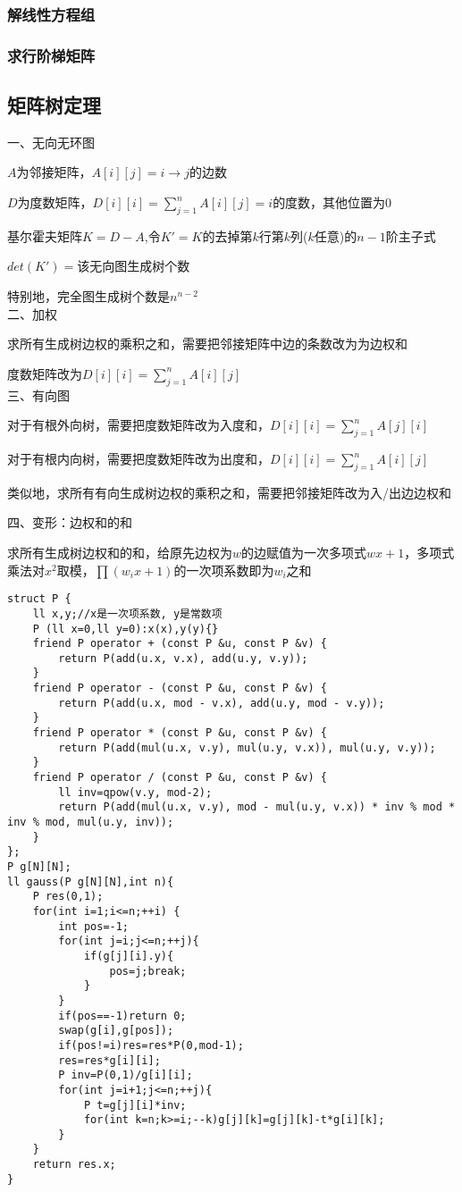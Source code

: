 \documentclass[a4paper]{article}
\begin{document}
\subsubsection{解线性方程组}

\subsubsection{求行阶梯矩阵}

\subsection{矩阵树定理}

一、无向无环图

$A$为邻接矩阵，$A[i][j]=i\to j$的边数

$D$为度数矩阵，$D[i][i]=\sum\limits_{j=1}^n A[i][j]=i$的度数，其他位置为0

基尔霍夫矩阵$K=D-A$,令$K'=K$的去掉第$k$行第$k$列($k$任意)的$n-1$阶主子式

$det(K')=$该无向图生成树个数

特别地，完全图生成树个数是$n^{n-2}$\\

二、加权

求所有生成树边权的乘积之和，需要把邻接矩阵中边的条数改为为边权和

度数矩阵改为$D[i][i]=\sum\limits_{j=1}^n A[i][j]$\\

三、有向图

对于有根外向树，需要把度数矩阵改为入度和，$D[i][i]=\sum\limits_{j=1}^nA[j][i]$

对于有根内向树，需要把度数矩阵改为出度和，$D[i][i]=\sum\limits_{j=1}^nA[i][j]$

类似地，求所有有向生成树边权的乘积之和，需要把邻接矩阵改为入/出边边权和

四、变形：边权和的和

求所有生成树边权和的和，给原先边权为$w$的边赋值为一次多项式$wx+1$，多项式乘法对$x^2$取模，$\prod (w_ix+1)$的一次项系数即为$w_i$之和

\begin{lstlisting}
struct P {
	ll x,y;//x是一次项系数, y是常数项
	P (ll x=0,ll y=0):x(x),y(y){}
	friend P operator + (const P &u, const P &v) {
		return P(add(u.x, v.x), add(u.y, v.y));
	}
	friend P operator - (const P &u, const P &v) {
		return P(add(u.x, mod - v.x), add(u.y, mod - v.y));
	}
	friend P operator * (const P &u, const P &v) {
		return P(add(mul(u.x, v.y), mul(u.y, v.x)), mul(u.y, v.y));
	}
	friend P operator / (const P &u, const P &v) {
		ll inv=qpow(v.y, mod-2);
		return P(add(mul(u.x, v.y), mod - mul(u.y, v.x)) * inv % mod * inv % mod, mul(u.y, inv));
	}
};
P g[N][N];
ll gauss(P g[N][N],int n){
	P res(0,1);
	for(int i=1;i<=n;++i) {
		int pos=-1;
		for(int j=i;j<=n;++j){
			if(g[j][i].y){
				pos=j;break;
			}
		}
		if(pos==-1)return 0;
		swap(g[i],g[pos]);
		if(pos!=i)res=res*P(0,mod-1);
		res=res*g[i][i];
		P inv=P(0,1)/g[i][i];
		for(int j=i+1;j<=n;++j){
			P t=g[j][i]*inv;
			for(int k=n;k>=i;--k)g[j][k]=g[j][k]-t*g[i][k];
		}
	}
	return res.x;
}
\end{lstlisting}
\end{document}
